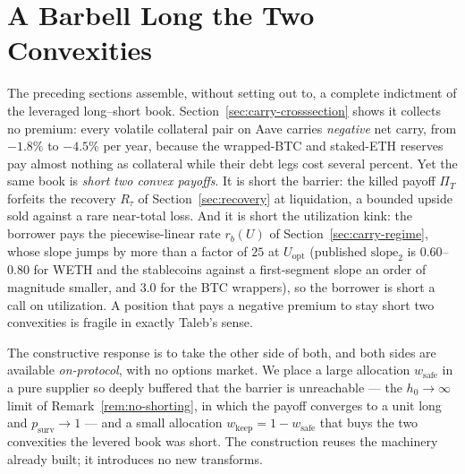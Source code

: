 
\section{A Barbell Long the Two Convexities}\label{sec:barbell}

The preceding sections assemble, without setting out to, a complete indictment of the leveraged
long--short book. Section~\ref{sec:carry-crosssection} shows it collects no premium: every
volatile collateral pair on Aave carries \emph{negative} net carry, from $-1.8\%$ to $-4.5\%$ per
year, because the wrapped-BTC and staked-ETH reserves pay almost nothing as collateral while their
debt legs cost several percent. Yet the same book is \emph{short two convex payoffs}. It is short
the barrier: the killed payoff $\Pi_T$ forfeits the recovery $R_\tau$ of Section~\ref{sec:recovery}
at liquidation, a bounded upside sold against a rare near-total loss. And it is short the
utilization kink: the borrower pays the piecewise-linear rate $r_b(U)$ of
Section~\ref{sec:carry-regime}, whose slope jumps by more than a factor of $25$ at $U_{\mathrm{opt}}$
(published $\mathrm{slope}_2$ is $0.60$--$0.80$ for WETH and the stablecoins against a
first-segment slope an order of magnitude smaller, and $3.0$ for the BTC wrappers), so the borrower
is short a call on utilization. A position that pays a negative premium to stay short two
convexities is fragile in exactly Taleb's sense.

The constructive response is to take the other side of both, and both sides are available
\emph{on-protocol}, with no options market. We place a large allocation $w_{\mathrm{safe}}$ in a
pure supplier so deeply buffered that the barrier is unreachable --- the $h_0\to\infty$ limit of
Remark~\ref{rem:no-shorting}, in which the payoff converges to a unit long and $p_{\mathrm{surv}}\to1$
--- and a small allocation $w_{\mathrm{keep}}=1-w_{\mathrm{safe}}$ that buys the two convexities the
levered book was short. The construction reuses the machinery already built; it introduces no new
transforms.

